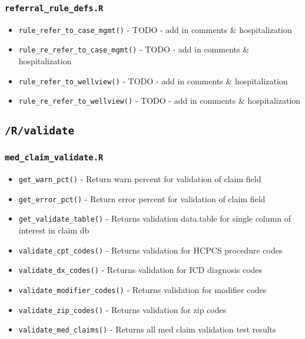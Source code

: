 \documentclass[
]{book}
\providecommand{\tightlist}{%
  \setlength{\itemsep}{0pt}\setlength{\parskip}{0pt}}
\begin{document}
\hypertarget{referral_rule_defs.r}{%
\subsubsection{\texorpdfstring{\texttt{referral\_rule\_defs.R}}{referral\_rule\_defs.R}}\label{referral_rule_defs.r}}

\begin{itemize}
\tightlist
\item
  \texttt{rule\_refer\_to\_case\_mgmt()} - TODO - add in comments \& hospitalization
\item
  \texttt{rule\_re\_refer\_to\_case\_mgmt()} - TODO - add in comments \& hospitalization
\item
  \texttt{rule\_refer\_to\_wellview()} - TODO - add in comments \& hospitalization
\item
  \texttt{rule\_re\_refer\_to\_wellview()} - TODO - add in comments \& hospitalization
\end{itemize}

\hypertarget{rvalidate}{%
\subsection{\texorpdfstring{\texttt{/R/validate}}{/R/validate}}\label{rvalidate}}

\hypertarget{med_claim_validate.r}{%
\subsubsection{\texorpdfstring{\texttt{med\_claim\_validate.R}}{med\_claim\_validate.R}}\label{med_claim_validate.r}}

\begin{itemize}
\tightlist
\item
  \texttt{get\_warn\_pct()} - Return warn percent for validation of claim field
\item
  \texttt{get\_error\_pct()} - Return error percent for validation of claim field
\item
  \texttt{get\_validate\_table()} - Returns validation data.table for single column of interest in claim db
\item
  \texttt{validate\_cpt\_codes()} - Returns validation for HCPCS procedure codes
\item
  \texttt{validate\_dx\_codes()} - Returns validation for ICD diagnosis codes
\item
  \texttt{validate\_modifier\_codes()} - Returns validation for modifier codes
\item
  \texttt{validate\_zip\_codes()} - Returns validation for zip codes
\item
  \texttt{validate\_med\_claims()} - Returns all med claim validation test results
\end{itemize}
\end{document}
